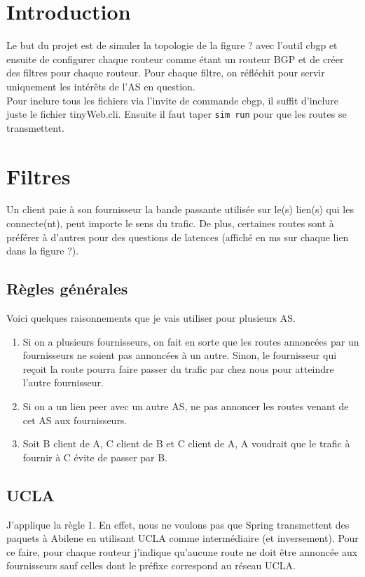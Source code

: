 \documentclass[a4paper, 12pt]{article}
\begin{document}


\section{Introduction}
Le but du projet est de simuler la topologie de la figure ? avec l'outil cbgp et ensuite de configurer chaque routeur comme étant un routeur BGP et de créer des filtres pour chaque routeur.
Pour chaque filtre, on réfléchit pour servir uniquement les intérêts de l'AS en question.
\\

Pour inclure tous les fichiers via l'invite de commande cbgp, il suffit d'inclure juste le fichier tinyWeb.cli.
Ensuite il faut taper \texttt{sim run} pour que les routes se transmettent.
\section{Filtres}
Un client paie à son fournisseur la bande passante utilisée sur le(s) lien(s) qui les connecte(nt), peut importe le sens du trafic.
De plus, certaines routes sont à préférer à d'autres pour des questions de latences (affiché en ms sur chaque lien dans la figure ?).
\subsection{Règles générales}
Voici quelques raisonnements que je vais utiliser pour plusieurs AS.
\begin{enumerate}
 \item Si on a plusieurs fournisseurs, on fait en sorte que les routes annoncées par un fournisseurs ne soient pas annoncées à un autre.
 Sinon, le fournisseur qui reçoit la route pourra faire passer du trafic par chez nous pour atteindre l'autre fournisseur.
 \item Si on a un lien peer avec un autre AS, ne pas annoncer les routes venant de cet AS aux fournisseurs.
 \item Soit B client de A, C client de B et C client de A, A voudrait que le trafic à fournir à C évite de passer par B. %
\end{enumerate}

\subsection{UCLA}
J'applique la règle 1.
En effet, nous ne voulons pas que Spring transmettent des paquets à Abilene en utilisant UCLA comme intermédiaire (et inversement).
Pour ce faire, pour chaque routeur j'indique qu'aucune route ne doit être annoncée aux fournisseurs sauf celles dont le préfixe correspond au réseau UCLA.
\end{document}
